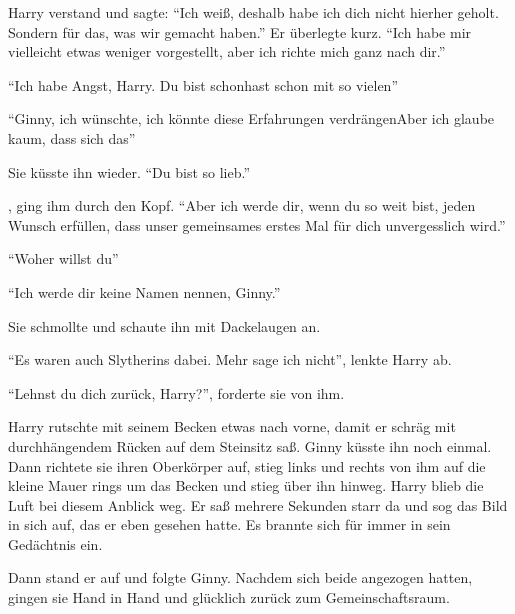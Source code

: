 Harry verstand und sagte: \enquote{Ich weiß, deshalb habe ich dich nicht hierher geholt. Sondern für das, was wir gemacht haben.} Er überlegte kurz. \enquote{Ich habe mir vielleicht etwas weniger vorgestellt, aber ich richte mich ganz nach dir.}

\enquote{Ich habe Angst, Harry. Du bist schon\abs hast schon mit so vielen\abs}

\enquote{Ginny, ich wünschte, ich könnte diese Erfahrungen verdrängen\abs Aber ich glaube kaum, dass sich das\abs}

Sie küsste ihn wieder. \enquote{Du bist so lieb.}

, ging ihm durch den Kopf. \enquote{Aber ich werde dir, wenn du so weit bist, jeden Wunsch erfüllen, dass unser gemeinsames erstes Mal für dich unvergesslich wird.}

\enquote{Woher willst du\abs}

\enquote{Ich werde dir keine Namen nennen, Ginny.}

Sie schmollte und schaute ihn mit Dackelaugen an.

\enquote{Es waren auch Slytherins dabei. Mehr sage ich nicht}, lenkte Harry ab.

\enquote{Lehnst du dich zurück, Harry?}, forderte sie von ihm.

Harry rutschte mit seinem Becken etwas nach vorne, damit er schräg mit durchhängendem Rücken auf dem Steinsitz saß. Ginny küsste ihn noch einmal. Dann richtete sie ihren Oberkörper auf, stieg links und rechts von ihm auf die kleine Mauer rings um das Becken und stieg über ihn hinweg. Harry blieb die Luft bei diesem Anblick weg. Er saß mehrere Sekunden starr da und sog das Bild in sich auf, das er eben gesehen hatte. Es brannte sich für immer in sein Gedächtnis ein.

Dann stand er auf und folgte Ginny. Nachdem sich beide angezogen hatten, gingen sie Hand in Hand und glücklich zurück zum Gemeinschaftsraum.

\trenn


